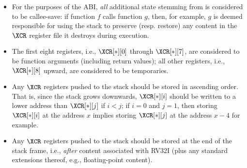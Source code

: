 \begin{itemize}
\item For the purposes of the ABI, {\em all} additional state stemming from 
      \XCID is considered to be callee-save: if function $f$ calls function
      $g$, then, for example, $g$ is deemed responsible for using the stack
      to preserve (resp. restore) any content in the $\XCR$ register file 
      it destroys during execution.
\item The first eight registers, 
      i.e., $\XCR[*][0]$ through $\XCR[*][7]$, 
      are considered to be function arguments (including return values); 
      all other registers, 
      i.e., $\XCR[*][8]$ upward,
      are considered to be temporaries.
\item Any $\XCR$ registers pushed to the stack should be stored 
      in ascending order.
      That is, since the stack grows downwards, 
      $\XCR[*][i]$
      should be written to a lower address than
      $\XCR[*][j]$
      if $i < j$; if $i = 0$ and $j = 1$, then storing $\XCR[*][i]$ at the
      address $x$ implies storing $\XCR[*][j]$ at the address $x - 4$ for
      example.
\item Any $\XCR$ registers pushed to the stack should be stored 
      at the end of the stack frame, 
      i.e., {\em after} content associated with RV32I (plus any standard 
      extensions thereof, e.g., floating-point content).
\end{itemize}

